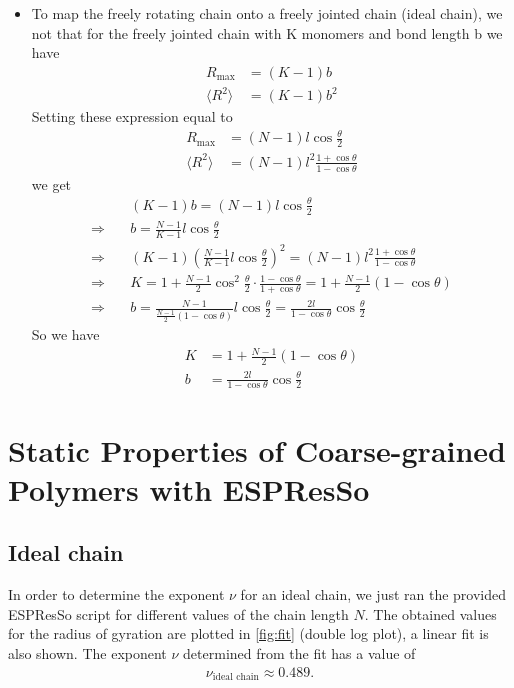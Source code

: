\documentclass[a4paper,10pt,bibtotoc]{scrartcl}
\begin{document}
\begin{itemize}
\item To map the freely rotating chain onto a freely jointed chain (ideal chain), we not that for the freely jointed chain with K monomers and bond length b we have
\begin{align}
R_\mathrm{max} &= \left(K-1\right) b\\
\langle R^2\rangle &= \left(K-1\right) b^2
\end{align}
Setting these expression equal to  
\begin{align}
R_\mathrm{max} &= \left(N-1\right) l\cos\frac{\theta}{2}\\
\langle R^2\rangle &= \left(N-1\right)l^2\frac{1+\cos\theta}{1-\cos\theta}
\end{align}
we get
\begin{align}
&\left(K-1\right) b = \left(N-1\right) l\cos\frac{\theta}{2}\\
\Rightarrow\quad& b =  \frac{N-1}{K-1} l\cos\frac{\theta}{2}\\
\Rightarrow\quad& \left(K-1\right) \left(\frac{N-1}{K-1} l\cos\frac{\theta}{2}\right)^2 = \left(N-1\right)l^2\frac{1+\cos\theta}{1-\cos\theta}\\
\Rightarrow\quad& K = 1 + \frac{N-1}{2} \cos^2\frac{\theta}{2}\cdot \frac{1-\cos\theta}{1+\cos\theta} = 1 + \frac{N-1}{2} \left(1-\cos\theta\right)\\
\Rightarrow\quad& b =  \frac{N-1}{\frac{N-1}{2} \left(1-\cos\theta\right)} l\cos\frac{\theta}{2} = \frac{2l}{1-\cos\theta} \cos\frac{\theta}{2}
\end{align}
So we have
\begin{align}
K & = 1 + \frac{N-1}{2} \left(1-\cos\theta\right)\\
b &=  \frac{2l}{1-\cos\theta} \cos\frac{\theta}{2}
\end{align}


\end{itemize}

\section{Static Properties of Coarse-grained Polymers with ESPResSo}
\subsection{Ideal chain}
In order to determine the exponent $\nu$ for an ideal chain, we just ran the provided ESPResSo script for different values of the chain length $N$. The obtained values for the radius of gyration are plotted in \autoref{fig:fit} (double log plot), a linear fit is also shown. The exponent $\nu$ determined from the fit has a value of 
\begin{align}
\nu_\text{ideal chain}\approx 0.489.
\end{align}
\end{document}
